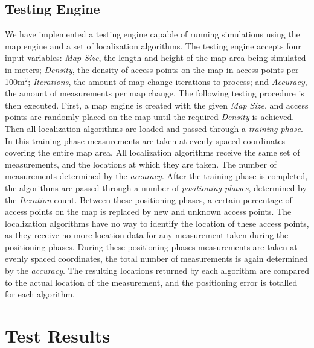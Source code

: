 \documentclass{sig-alternate-br}
\begin{document}
\subsection{Testing Engine}
We have implemented a testing engine capable of running simulations using the map engine and a set of localization algorithms. The testing engine accepts four input variables: \textit{Map Size}, the length and height of the map area being simulated in meters; \textit{Density}, the density of access points on the map in access points per 100m$^2$; \textit{Iterations}, the amount of map change iterations to process; and \textit{Accuracy}, the amount of measurements per map change. The following testing procedure is then executed. First, a map engine is created with the given \textit{Map Size}, and access points are randomly placed on the map until the required \textit{Density} is achieved. Then all localization algorithms are loaded and passed through a \textit{training phase}. In this training phase measurements are taken at evenly spaced coordinates covering the entire map area. All localization algorithms receive the same set of measurements, and the locations at which they are taken. The number of measurements determined by the \textit{accuracy}. After the training phase is completed, the algorithms are passed through a number of \textit{positioning phases}, determined by the \textit{Iteration} count. Between these positioning phases, a certain percentage of access points on the map is replaced by new and unknown access points. The localization algorithms have no way to identify the location of these access points, as they receive no more location data for any measurement taken during the positioning phases. During these positioning phases measurements are taken at evenly spaced coordinates, the total number of measurements is again determined by the \textit{accuracy}. The resulting locations returned by each algorithm are compared to the actual location of the measurement, and the positioning error is totalled for each algorithm.

\section{Test Results}
\end{document}
